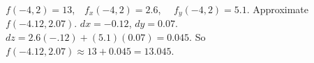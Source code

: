 {$f(-4,2) = 13$,\ \  $f_x(-4,2) = 2.6$, \ \ $f_y(-4,2) = 5.1$.  Approximate $f(-4.12, 2.07)$. 
}
{$dx = -0.12$, $dy = 0.07$. $dz = 2.6(-.12)+(5.1)(0.07) = 0.045$. So $f(-4.12, 2.07) \approx 13+0.045=13.045$.
}